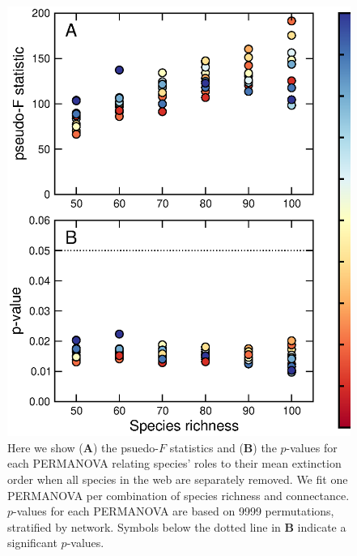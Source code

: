 \documentclass[12pt]{article}
\begin{document}
			\begin{figure}[hb!]
				\caption{Here we show (\textbf{A}) the psuedo-$F$ statistics and (\textbf{B}) the $p$-values for each PERMANOVA relating species' roles to their mean extinction order when all species in the web are separately removed. We fit one PERMANOVA per combination of species richness and connectance. $p$-values for each PERMANOVA are based on 9999 permutations, stratified by network. Symbols below the dotted line in \textbf{B} indicate a significant $p$-values.}
				\label{permfig}
				\includegraphics[height=.5\textheight]{figures/extinction_order/permanova_summary_paper_full.eps}
				\end{figure}
\end{document}
